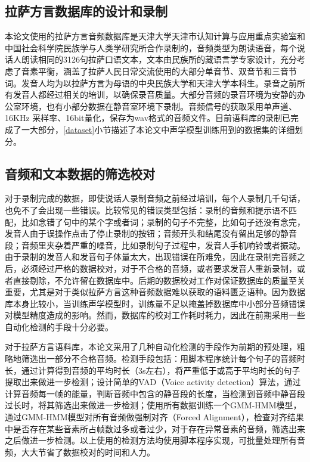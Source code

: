 \subsection{拉萨方言数据库的设计和录制}
本论文使用的拉萨方言音频数据库是天津大学天津市认知计算与应用重点实验室和中国社会科学院民族学与人类学研究所合作录制的，音频类型为朗读语音，每个说话人朗读相同的3126句拉萨口语文本，文本由民族所的藏语言学专家设计，充分考虑了音素平衡，涵盖了拉萨人民日常交流使用的大部分单音节、双音节和三音节词。发音人均为以拉萨方言为母语的中央民族大学和天津大学本科生。录音之前所有发音人都经过相关的培训，以确保录音质量。大部分音频的录音环境为安静的办公室环境，也有小部分数据在静音室环境下录制。音频信号的获取采用单声道、16KHz 采样率、16bit量化，保存为wav格式的音频文件。目前语料库的录制已完成了一大部分，\ref{dataset}小节描述了本论文中声学模型训练用到的数据集的详细划分。
\subsection{音频和文本数据的筛选校对}
对于录制完成的数据，即使说话人录制音频之前经过培训，每个人录制几千句话，也免不了会出现一些错误。比较常见的错误类型包括：录制的音频和提示语不匹配，比如念错了句中的某个字或者词；录制的句子不完整，比如句子还没有念完，发音人由于误操作点击了停止录制的按钮；音频开头和结尾没有留出足够的静音段；音频里夹杂着严重的噪音，比如录制句子过程中，发音人手机响铃或者振动。由于录制的发音人和发音句子体量太大，出现错误在所难免，因此在录制完音频之后，必须经过严格的数据校对，对于不合格的音频，或者要求发音人重新录制，或者直接剔除，不允许留在数据库中。后期的数据校对工作对保证数据库的质量至关重要，尤其是对于类似拉萨方言这种音频数据难以获取的语料匮乏语种。因为数据库本身比较小，当训练声学模型时，训练量不足以掩盖掉数据库中小部分音频错误对模型精度造成的影响。然而，数据库的校对工作耗时耗力，因此在前期采用一些自动化检测的手段十分必要。

对于拉萨方言语料库，本论文采用了几种自动化检测的手段作为前期的预处理，粗略地筛选出一部分不合格音频。检测手段包括：用脚本程序统计每个句子的音频时长，通过计算得到音频的平均时长（3s左右），将严重低于或高于平均时长的句子提取出来做进一步检测；设计简单的VAD（Voice activity detection）算法，通过计算音频每一帧的能量，判断音频中包含的静音段的长度，当检测到音频中静音段过长时，将其筛选出来做进一步检测；使用所有数据训练一个GMM-HMM模型\cite{rabiner1989tutorial}，通过GMM-HMM模型对所有音频做强制对齐（Forced Alignment）\cite{sheh2003chord}，检查对齐结果中是否存在某些音素所占帧数过多或者过少，对于存在异常音素的音频，筛选出来之后做进一步检测。以上使用的检测方法均使用脚本程序实现，可批量处理所有音频，大大节省了数据校对的时间和人力。